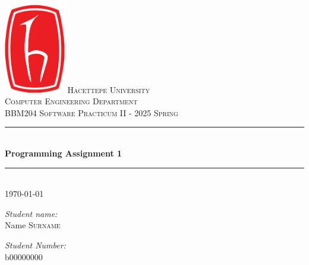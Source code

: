 \documentclass[11pt]{article}
\begin{document}
%


\begin{titlepage}
\newcommand{\HRule}{\rule{\linewidth}{0.5mm}}

\center

\includegraphics[width=0.2\textwidth]{logo.png}
\vfill
\textsc{\LARGE Hacettepe University}\\[0.5cm]
\textsc{\Large Computer Engineering Department}\\[1.5cm]
\textsc{\large BBM204 Software Practicum II - 2025 Spring}\\[0.5cm]

\HRule \\[0.4cm]
{ \huge \bfseries Programming Assignment 1}\\[0.4cm] 
\HRule \\[0.3cm]
{\large \today}\\[2cm]
\begin{minipage}{0.4\textwidth}
\begin{flushleft} \large
\emph{Student name:}\\
Name \textsc{Surname}
\end{flushleft}
\end{minipage}
\begin{minipage}{0.4\textwidth}
\begin{flushright} \large
\emph{Student Number:} \\
b00000000
\end{flushright}
\end{minipage}\\[2cm]
\vfill
\end{titlepage}
\end{document}
